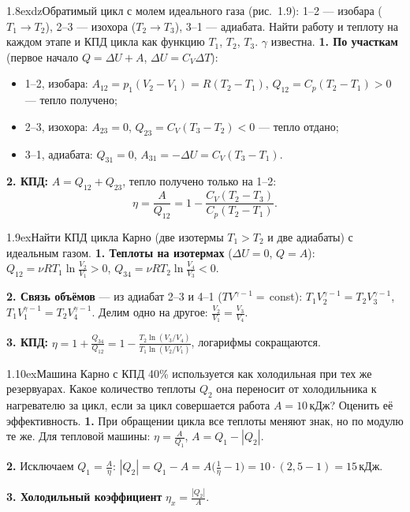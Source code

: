 \begin{problem}{1.8}{exdz}{Обратимый цикл с молем идеального газа (рис.~1.9): 1--2 — изобара ($T_1\to T_2$), 2--3 — изохора ($T_2\to T_3$), 3--1 — адиабата.
Найти работу и теплоту на каждом этапе и КПД цикла как функцию $T_1$, $T_2$, $T_3$. $\gamma$ известна.}
\textbf{1. По участкам} (первое начало $Q=\Delta U+A$, $\Delta U=C_V\Delta T$):
\begin{itemize}
\item 1--2, изобара: $A_{12}=p_1(V_2-V_1)=R(T_2-T_1)$, $Q_{12}=C_p(T_2-T_1)>0$ — тепло получено;
\item 2--3, изохора: $A_{23}=0$, $Q_{23}=C_V(T_3-T_2)<0$ — тепло отдано;
\item 3--1, адиабата: $Q_{31}=0$, $A_{31}=-\Delta U=C_V(T_3-T_1)$.
\end{itemize}

\textbf{2. КПД:} $A=Q_{12}+Q_{23}$, тепло получено только на 1--2:
\[\eta=\frac{A}{Q_{12}}=1-\frac{C_V(T_2-T_3)}{C_p(T_2-T_1)}.\]
\end{problem}

\begin{problem}{1.9}{ex}{Найти КПД цикла Карно (две изотермы $T_1>T_2$ и две адиабаты) с идеальным газом.}
\textbf{1. Теплоты на изотермах} ($\Delta U=0$, $Q=A$): $Q_{12}=\nu RT_1\ln\frac{V_2}{V_1}>0$, $Q_{34}=\nu RT_2\ln\frac{V_4}{V_3}<0$.

\textbf{2. Связь объёмов} — из адиабат 2--3 и 4--1 ($TV^{\gamma-1}=$\,const): $T_1V_2^{\gamma-1}=T_2V_3^{\gamma-1}$, $T_1V_1^{\gamma-1}=T_2V_4^{\gamma-1}$.
Делим одно на другое: $\frac{V_2}{V_1}=\frac{V_3}{V_4}$.

\textbf{3. КПД:} $\eta=1+\frac{Q_{34}}{Q_{12}}=1-\frac{T_2\ln(V_3/V_4)}{T_1\ln(V_2/V_1)}$, логарифмы сокращаются.
\end{problem}

\begin{problem}{1.10}{ex}{Машина Карно с КПД 40\% используется как холодильная при тех же резервуарах. Какое количество теплоты $Q_2$ она переносит от холодильника
к нагревателю за цикл, если за цикл совершается работа $A=10$\,кДж? Оценить её эффективность.}
\textbf{1.} При обращении цикла все теплоты меняют знак, но по модулю те же. Для тепловой машины: $\eta=\frac A{Q_1}$, $A=Q_1-|Q_2|$.

\textbf{2.} Исключаем $Q_1=\frac A\eta$: $|Q_2|=Q_1-A=A\big(\frac1\eta-1\big)=10\cdot(2{,}5-1)=15$\,кДж.

\textbf{3. Холодильный коэффициент} $\eta_x=\frac{|Q_2|}{A}$.
\end{problem}

